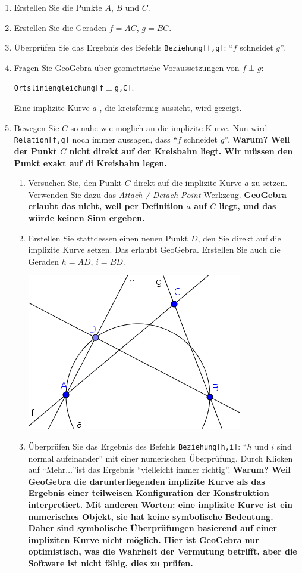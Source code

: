 \documentclass{article}
\begin{document}
\begin{enumerate}
    \item Erstellen Sie die Punkte $A$, $B$ und $C$.
    \item Erstellen Sie die Geraden $f=AC$, $g=BC$.
    \item Überprüfen Sie das Ergebnis des Befehls \texttt{Beziehung[f,g]}: ``$f$ schneidet $g$''.
    \item Fragen Sie GeoGebra über geometrische Voraussetzungen von $f\perp g$:
\begin{center}\texttt{Ortsliniengleichung[f$\perp$g,C]}.\end{center}
Eine implizite Kurve $a$ , die kreisförmig aussieht, wird gezeigt.
    \item Bewegen Sie $C$ so nahe wie möglich an die implizite Kurve. Nun wird \texttt{Relation[f,g]} noch immer aussagen, dass ``$f$ schneidet $g$''. \textbf{Warum? Weil der Punkt $C$ nicht direkt auf der Kreisbahn liegt. Wir müssen den Punkt exakt auf di Kreisbahn legen.}
    \begin{enumerate}
      \item Versuchen Sie, den Punkt $C$ direkt auf die implizite Kurve $a$ zu setzen. Verwenden Sie dazu das  \textit{Attach / Detach Point} Werkzeug. \textbf{GeoGebra erlaubt das nicht, weil per Definition $a$ auf $C$ liegt, und das würde keinen Sinn ergeben.}
      \item Erstellen Sie stattdessen einen neuen Punkt $D$, den Sie direkt auf die implizite Kurve setzen. Das erlaubt GeoGebra. Erstellen Sie auch die Geraden $h=AD$, $i=BD$.
\begin{center}
\includegraphics[scale=0.5]{limitations-Thales1-2}
\end{center}
      \item Überprüfen Sie das Ergebnis des Befehls \texttt{Beziehung[h,i]}: ``$h$ und $i$ sind normal aufeinander'' mit einer numerischen Überprüfung. Durch Klicken auf ``Mehr$\ldots$''ist das Ergebnis ``vielleicht immer richtig''. \textbf{Warum? Weil GeoGebra die darunterliegenden implizite Kurve als das Ergebnis einer teilweisen Konfiguration der Konstruktion interpretiert. Mit anderen Worten: eine implizite Kurve ist ein numerisches Objekt, sie hat keine symbolische Bedeutung. Daher sind symbolische Überprüfungen basierend auf einer impliziten Kurve nicht möglich. Hier ist GeoGebra nur optimistisch, was die Wahrheit der Vermutung betrifft, aber die Software ist nicht fähig, dies zu prüfen.}

\end{enumerate}
\end{enumerate}
\end{document}
